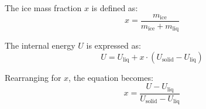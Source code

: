 The ice mass fraction \( x \) is defined as:  
\[
x = \frac{m_{\text{ice}}}{m_{\text{ice}} + m_{\text{liq}}}
\]

The internal energy \( U \) is expressed as:  
\[
U = U_{\text{liq}} + x \cdot (U_{\text{solid}} - U_{\text{liq}})
\]

Rearranging for \( x \), the equation becomes:  
\[
x = \frac{U - U_{\text{liq}}}{U_{\text{solid}} - U_{\text{liq}}}
\]